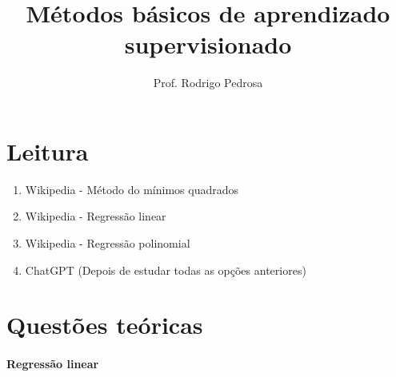 \documentclass{article}
\title{Métodos básicos de aprendizado supervisionado}
\author{Prof. Rodrigo Pedrosa}
\begin{document}
\maketitle

\vspace{-1.2cm}

\section{Leitura}

\begin{enumerate}
    \item Wikipedia - Método do mínimos quadrados
    \item Wikipedia - Regressão linear
    \item Wikipedia - Regressão polinomial
    \item ChatGPT (Depois de estudar todas as opções anteriores)
\end{enumerate} 

\section{Questões teóricas}

\paragraph{Regressão linear}
\end{document}
